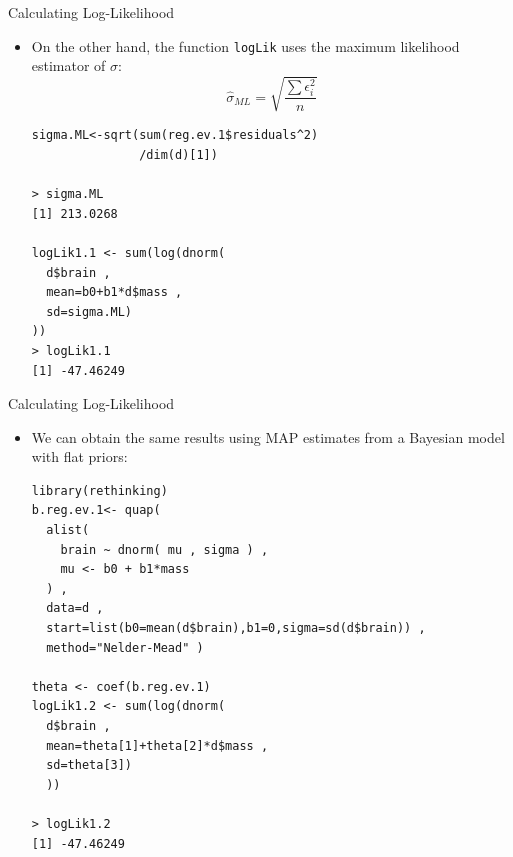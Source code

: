 \documentclass[handout]{beamer}
\begin{document}
\begin{frame}[fragile]{Calculating Log-Likelihood}
\scriptsize{

\begin{itemize}

\item On the other hand, the function \verb+logLik+ uses the maximum likelihood estimator of $\sigma$:
\begin{displaymath}
 \hat{\sigma}_{ML} = \sqrt{\frac{\sum \epsilon_i^2}{n}}
\end{displaymath}

\begin{verbatim}
sigma.ML<-sqrt(sum(reg.ev.1$residuals^2)
               /dim(d)[1])

> sigma.ML
[1] 213.0268

logLik1.1 <- sum(log(dnorm(
  d$brain ,
  mean=b0+b1*d$mass ,
  sd=sigma.ML)
))
> logLik1.1
[1] -47.46249
\end{verbatim}



\end{itemize}


}
\end{frame}


\begin{frame}[fragile]{Calculating Log-Likelihood}
\scriptsize{

\begin{itemize}

\item We can obtain the same results using MAP estimates from a Bayesian model with flat priors:

\begin{verbatim}
library(rethinking)
b.reg.ev.1<- quap(
  alist(
    brain ~ dnorm( mu , sigma ) ,
    mu <- b0 + b1*mass
  ) ,
  data=d ,
  start=list(b0=mean(d$brain),b1=0,sigma=sd(d$brain)) ,
  method="Nelder-Mead" )

theta <- coef(b.reg.ev.1)
logLik1.2 <- sum(log(dnorm(
  d$brain ,
  mean=theta[1]+theta[2]*d$mass ,
  sd=theta[3])
  ))

> logLik1.2
[1] -47.46249
\end{verbatim}



\end{itemize}


}
\end{frame}
\end{document}
